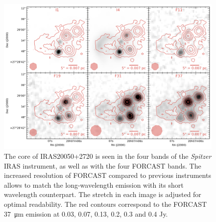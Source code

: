 
\begin{landscape}
\begin{figure}
\begin{center}
\includegraphics[width=1.3\textwidth]{Figures/IRAS20050.png}
\caption[Multi-wavelength view of the IRAS~20050+2720 core]{The core of IRAS20050+2720 is seen in the four bands of the \textit{Spitzer} IRAS instrument, as well as with the four FORCAST bands. The increased resolution of FORCAST compared to previous instruments allows to match the long-wavelength emission with its short wavelength counterpart. The stretch in each image is adjusted for optimal readability. The red contours correspond to the FORCAST \SI{37}{\micro\meter} emission at 0.03, 0.07, 0.13, 0.2, 0.3 and 0.4 Jy.}
\label{fig:IRAS20050_mosaic}
\end{center}
\end{figure}
\end{landscape}



